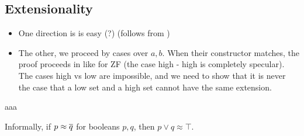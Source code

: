 \subsection{Extensionality}

\begin{itemize}
  \item One direction is is easy (?) (follows from )
  \item The other, we proceed by cases over $a, b$. When their constructor matches, the proof proceeds in like for ZF (the case high - high is completely specular). The cases high vs low are impossible, and we need to show that it is never the case that a low set and a high set cannot have the same extension.
\end{itemize}
aaa

Informally, if $p \approx \overline{q}$ for booleans $p,q$, then $p \lor q \approx \top$.

